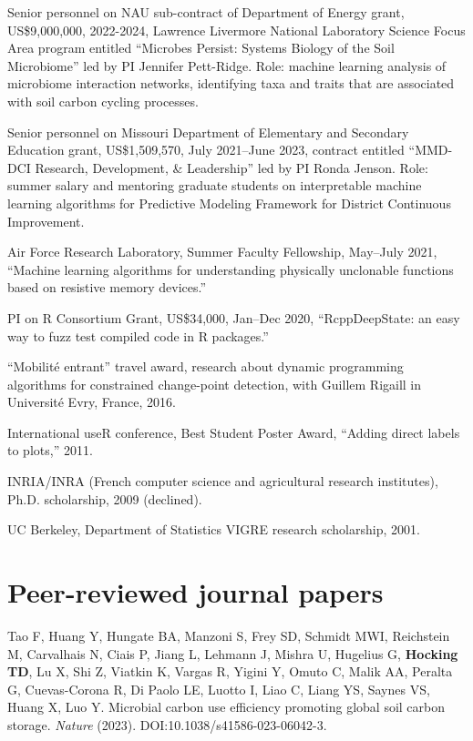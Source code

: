 \documentclass[margin,line]{res}
\begin{document}
\begin{resume}
Senior personnel on NAU sub-contract of Department of Energy grant,
US\$9,000,000, 2022-2024, Lawrence Livermore National Laboratory
Science Focus Area program entitled ``Microbes Persist: Systems
Biology of the Soil Microbiome'' led by PI Jennifer
Pett-Ridge. Role: machine learning analysis of microbiome
interaction networks, identifying taxa and traits that are associated
with soil carbon cycling processes.

Senior personnel on Missouri Department of Elementary and Secondary
Education grant, US\$1,509,570, July 2021--June 2023, contract entitled
``MMD-DCI Research, Development, \& Leadership'' led by PI Ronda
Jenson. Role: summer salary and mentoring graduate students on
interpretable machine learning algorithms for Predictive Modeling
Framework for District Continuous Improvement.

Air Force Research Laboratory, Summer Faculty Fellowship, May--July
2021, ``Machine learning algorithms for understanding physically
unclonable functions based on resistive memory devices.''

PI on R Consortium Grant, US\$34,000, Jan--Dec 2020, ``RcppDeepState: an easy
way to fuzz test compiled code in R packages.''

``Mobilit\'e entrant'' travel award, research about dynamic
programming algorithms for constrained change-point detection, with
Guillem Rigaill in Universit\'e Evry, France, 2016.

International useR conference, Best Student Poster Award, ``Adding
direct labels to plots,'' 2011.

INRIA/INRA (French computer science and agricultural research institutes), Ph.D. scholarship, 2009 (declined).

UC Berkeley, Department of Statistics VIGRE research scholarship, 2001.


\section{\sc Peer-reviewed journal papers}

Tao F, Huang Y, Hungate BA, Manzoni S, Frey SD, Schmidt MWI,
Reichstein M, Carvalhais N, Ciais P, Jiang L, Lehmann J, Mishra U,
Hugelius G, {\bf Hocking TD}, Lu X, Shi Z, Viatkin K, Vargas R, Yigini
Y, Omuto C, Malik AA, Peralta G, Cuevas-Corona R, Di Paolo LE, Luotto
I, Liao C, Liang YS, Saynes VS, Huang X, Luo Y. Microbial carbon use
efficiency promoting global soil carbon storage. {\it Nature} (2023).
DOI:10.1038/s41586-023-06042-3.


\end{resume}
\end{document}
